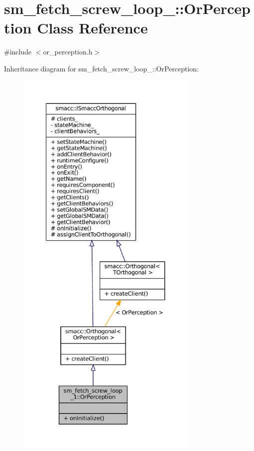 \hypertarget{classsm__fetch__screw__loop__1_1_1OrPerception}{}\section{sm\+\_\+fetch\+\_\+screw\+\_\+loop\+\_\+:\+:Or\+Perception Class Reference}
\label{classsm__fetch__screw__loop__1_1_1OrPerception}


{\ttfamily \#include $<$or\+\_\+perception.\+h$>$}



Inheritance diagram for sm\+\_\+fetch\+\_\+screw\+\_\+loop\+\_\+:\+:Or\+Perception\+:
\nopagebreak
\begin{figure}[H]
\begin{center}
\leavevmode
\includegraphics[height=550pt]{classsm__fetch__screw__loop__1_1_1OrPerception__inherit__graph}
\end{center}
\end{figure}


